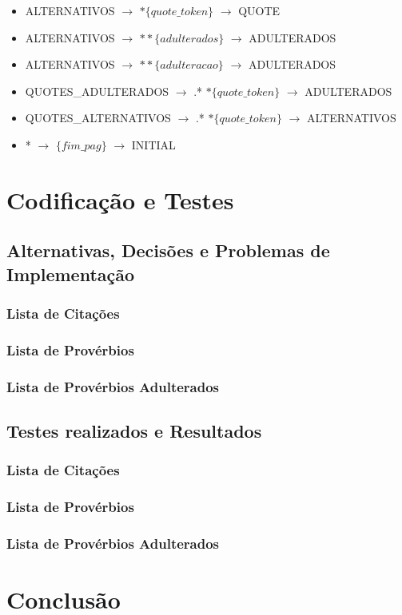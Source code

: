 \documentclass[11pt,a4paper]{report}
\begin{document}
\begin{itemize}
\begin{itemize}
			\item ALTERNATIVOS $\rightarrow$ $*\{quote\_token\}$ $\rightarrow$ QUOTE
			\item ALTERNATIVOS $\rightarrow$ $**\{adulterados\}$ $\rightarrow$ ADULTERADOS
			\item ALTERNATIVOS $\rightarrow$ $**\{adulteracao\}$ $\rightarrow$ ADULTERADOS
			\item QUOTES\_ADULTERADOS $\rightarrow$ .* $*\{quote\_token\}$ $\rightarrow$ ADULTERADOS
			\item QUOTES\_ALTERNATIVOS $\rightarrow$ .* $*\{quote\_token\}$ $\rightarrow$ ALTERNATIVOS
			\item * $\rightarrow$ $\{fim\_pag\}$ $\rightarrow$ INITIAL
		\end{itemize}
\end{itemize}


\chapter{Codificação e Testes}
\label{chap:codificacao}

\section{Alternativas, Decisões e Problemas de Implementação}
\subsection{Lista de Citações}


\subsection{Lista de Provérbios}


\subsection{Lista de Provérbios Adulterados}


\section{Testes realizados e Resultados}
\subsection{Lista de Citações}


\subsection{Lista de Provérbios}


\subsection{Lista de Provérbios Adulterados}


\chapter{Conclusão}
\label{chap:concl}
\end{document}
